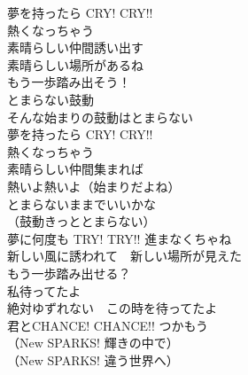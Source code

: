 {夢を持ったら CRY! CRY!!\\
熱くなっちゃう\\
素晴らしい仲間誘い出す\\
素晴らしい場所があるね\\
もう一歩踏み出そう！\\
とまらない鼓動\\
そんな始まりの鼓動はとまらない\\

夢を持ったら CRY! CRY!!\\
熱くなっちゃう\\
素晴らしい仲間集まれば\\
熱いよ熱いよ（始まりだよね）\\
とまらないままでいいかな\\
（鼓動きっととまらない）\\

夢に何度も TRY! TRY!! 進まなくちゃね\\
新しい風に誘われて　新しい場所が見えた\\
もう一歩踏み出せる？\\
私待ってたよ\\
絶対ゆずれない　この時を待ってたよ\\
君とCHANCE! CHANCE!! つかもう\\

（New SPARKS! 輝きの中で）\\
（New SPARKS! 違う世界へ）\\
}

